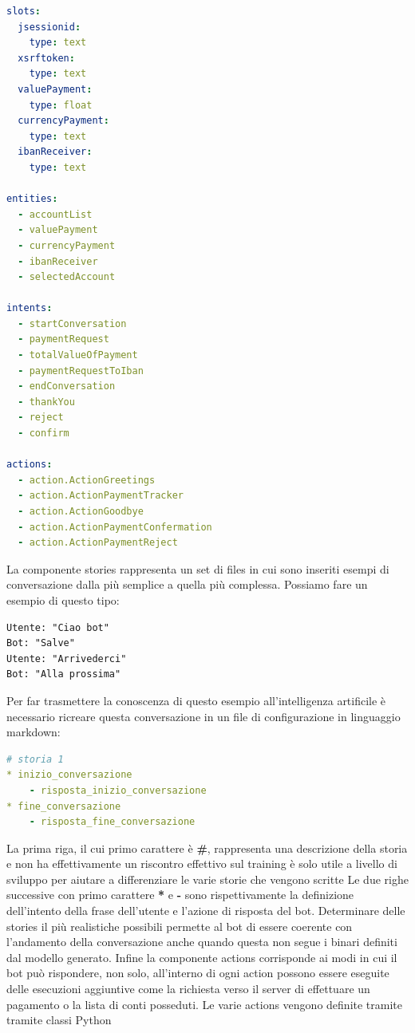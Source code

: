 \begin{lstlisting}[language=yaml,firstnumber=1]
slots:
  jsessionid:
    type: text
  xsrftoken:
    type: text
  valuePayment:
    type: float
  currencyPayment:
    type: text
  ibanReceiver:
    type: text

entities:
  - accountList
  - valuePayment
  - currencyPayment
  - ibanReceiver
  - selectedAccount

intents:
  - startConversation
  - paymentRequest
  - totalValueOfPayment
  - paymentRequestToIban
  - endConversation
  - thankYou
  - reject
  - confirm

actions:
  - action.ActionGreetings
  - action.ActionPaymentTracker
  - action.ActionGoodbye
  - action.ActionPaymentConfermation
  - action.ActionPaymentReject
\end{lstlisting}
La componente stories rappresenta un set di files in cui sono inseriti esempi di conversazione dalla più semplice a quella più complessa. Possiamo fare un esempio di questo tipo:
\begin{lstlisting}
Utente: "Ciao bot"
Bot: "Salve"
Utente: "Arrivederci"
Bot: "Alla prossima"
\end{lstlisting}
Per far trasmettere la conoscenza di questo esempio all'intelligenza artificile è necessario ricreare questa conversazione in un file di configurazione in linguaggio markdown:
\begin{lstlisting}[language=yaml]
# storia 1
* inizio_conversazione
    - risposta_inizio_conversazione
* fine_conversazione
    - risposta_fine_conversazione
\end{lstlisting}
La prima riga, il cui primo carattere è \textbf{#}, rappresenta una descrizione della storia e non ha effettivamente un riscontro effettivo sul training è solo utile a livello di sviluppo per aiutare a differenziare le varie storie che vengono scritte
Le due righe successive con primo carattere \textbf{*} e \textbf{-} sono rispettivamente la definizione dell'intento della frase dell'utente e l'azione di risposta del bot.
Determinare delle stories il più realistiche possibili permette al bot di essere coerente con l'andamento della conversazione anche quando questa non segue i binari definiti dal modello generato.
Infine la componente actions corrisponde ai modi in cui il bot può rispondere, non solo, all'interno di ogni action possono essere eseguite delle esecuzioni aggiuntive come la richiesta verso il server di effettuare un pagamento o la lista di conti posseduti. 
Le varie actions vengono definite tramite tramite classi Python 

